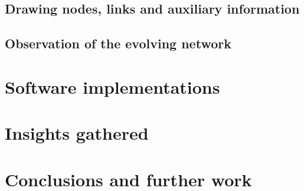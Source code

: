 \documentclass[runningheads]{llncs}
\begin{document}
\subsection{Drawing nodes, links and auxiliary information}
\subsection{Observation of the evolving network}

\section{Software implementations}\label{sec:imp}
\section{Insights gathered}\label{sec:ins}
\section{Conclusions and further work}\label{sec:con}
%
%
%


%
% 
% 
% 
% 
\end{document}
